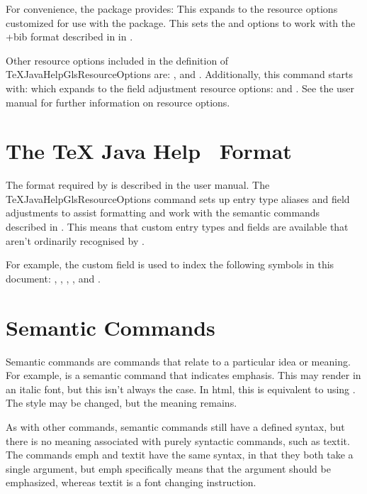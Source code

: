 \documentclass[toc=listof]{scrreport}
\newcommand{\TeXJavaHelp}{\texorpdfstring{\TeX{}}{TeX} Java Help}
\begin{document}
For convenience, the  package provides:
This expands to the resource options customized for use with the
 package. This sets the 
and  options to work with the \ext+{bib} format described in
in .

Other resource options included in the definition of
\gls{TeXJavaHelpGlsResourceOptions}
are: ,  and . Additionally, this command
starts with:
which expands to the field adjustment resource options: 
 and .
See the  user manual for further information on resource options.

\section{The \TeXJavaHelp\  Format}
\label{sec:bibformat}

The  format required by  is described in the
 user manual. The \gls{TeXJavaHelpGlsResourceOptions} command
sets up entry type aliases and field adjustments to assist formatting and work
with the semantic commands described in .
This means that custom entry types and fields are available that aren't
ordinarily recognised by .

For example, the custom  field is used to index
the following symbols in this document:
, , ,
, and .


\section{Semantic Commands}
\label{sec:semanticcmds}

Semantic commands are commands that relate to a particular idea or meaning.
For example,  is a semantic command that indicates
emphasis. This may render  in an italic font, but this isn't always the
case. In \gls{html}, this is equivalent to using
.
The style may be changed, but the meaning remains.

As with other commands, semantic commands still have a defined syntax, but
there is no meaning associated with purely syntactic commands, such as
\gls{textit}. The commands \gls{emph} and \gls{textit} have the same syntax, in that
they both take a single argument, but \gls{emph} specifically means that the
argument should be emphasized, whereas \gls{textit} is a font changing
instruction.
\end{document}
